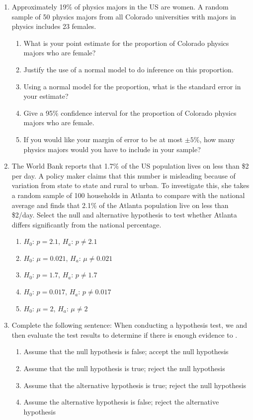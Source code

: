 \documentclass[12pt,fullpage]{amsart}
\begin{document}
\begin{enumerate}
\item
  Approximately 19\% of physics majors in the US are women. A random sample of 50 physics majors from all Colorado universities with majors in physics includes 23 females.
  \begin{enumerate}
  \item What is your point estimate for the proportion of Colorado physics majors who are female?
    \item Justify the use of a normal model to do inference on this proportion. 
  \item Using a normal model for the proportion, what is the standard error in your estimate?
    \item Give a 95\% confidence interval for the proportion of Colorado physics majors who are female.
    \item If you would like your margin of error to be at most $\pm 5\%$, how many physics majors would you have to include in your sample?
  \end{enumerate}

  \vfill
  
\item
The World Bank reports that 1.7\% of the US population lives on less than \$2 per day.  A policy maker claims that this number is misleading because of variation from state to state and rural to urban. To investigate this, she takes a random sample of 100 households in Atlanta to compare with the national average and finds that 2.1\% of the Atlanta population live on less than \$2/day. Select the null and alternative hypothesis to test whether Atlanta differs significantly from the national percentage.
\begin{enumerate}
\item $H_0$: $p= 2.1$,   $H_a$: $p \neq 2.1$
\item $H_0$: $\mu=0.021$, $H_a$: $\mu \neq 0.021$
\item $H_0$: $p=1.7$,	  $H_a$: $p \neq 1.7$
\item $H_0$: $p= 0.017$, $H_a$: $p \neq 0.017$
\item $H_0$: $\mu = 2$, $H_a$: $\mu \neq 2$
\end{enumerate}

\vfill

\item
Complete the following sentence: When conducting a hypothesis test, we \underline{\hspace{1in}} and then evaluate the test results to determine if there is enough evidence to \underline{\hspace{1in}}.
\begin{enumerate}
\item	Assume that the null hypothesis is false; accept the null hypothesis
\item	Assume that the null hypothesis is true; reject the null hypothesis
\item	Assume that the alternative hypothesis is true; reject the null hypothesis
\item	Assume the alternative hypothesis is false; reject the alternative hypothesis
\end{enumerate}


\end{enumerate}
\end{document}
